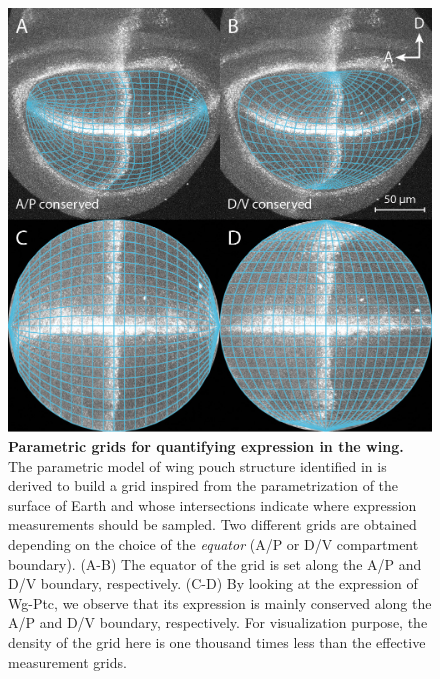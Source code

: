 \begin{figure}[!h]
\centering
\includegraphics[scale=0.3]{images/expression_grids.jpg}
\caption{\textbf{Parametric grids for quantifying expression in the \droso wing.} The parametric model of wing pouch structure identified in  is derived to build a grid inspired from the parametrization of the surface of Earth and whose intersections indicate where expression measurements should be sampled. Two different grids are obtained depending on the choice of the \emph{equator} (A/P or D/V compartment boundary). (A-B) The equator of the grid is set along the A/P and D/V boundary, respectively. (C-D) By looking at the expression of Wg-Ptc, we observe that its expression is mainly conserved along the A/P and D/V boundary, respectively. For visualization purpose, the density of the grid here is one thousand times less than the effective measurement grids.}
\label{fig:expression_grids}
\end{figure}

